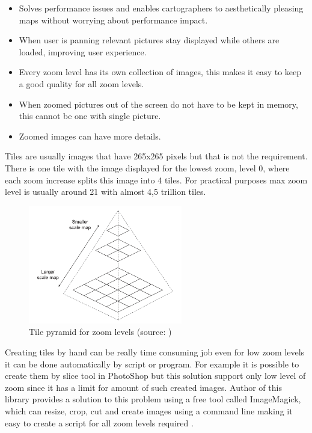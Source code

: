 \begin{itemize}
	\item Solves performance issues and enables cartographers to aesthetically pleasing maps without worrying about performance impact.
	\item When user is panning relevant pictures stay displayed while others are loaded, improving user experience.
	\item Every zoom level has its own collection of images, this makes it easy to keep a good quality for all zoom levels.
	\item When zoomed pictures out of the screen do not have to be kept in memory, this cannot be one with single picture.
	\item Zoomed images can have more details.
\end{itemize}

Tiles are usually images that have 265x265 pixels but that is not the requirement. There is one tile with the image displayed for the lowest zoom, level 0, where each zoom increase splits this image into 4 tiles. For practical purposes max zoom level is usually around 21 with almost 4,5 trillion tiles.

\begin{figure}[H]
	\begin{centering}
		\includegraphics[width=0.6\textwidth]{img/tile_pyramid}
		\par\end{centering}
	\caption{Tile pyramid for zoom levels (source: \cite{WTM})\label{fig:TilePyramid}}
	\label{fig03c05}
\end{figure}

Creating tiles by hand can be really time consuming job even for low zoom levels it can be done automatically by script or program. For example it is possible to create them by slice tool in PhotoShop but this solution support only low level of zoom since it has a limit for amount of such created images. Author of this library provides a solution to this problem using a free tool called ImageMagick, which can resize, crop, cut and create images using a command line making it easy to create a script for all zoom levels required \cite{TileView}.

